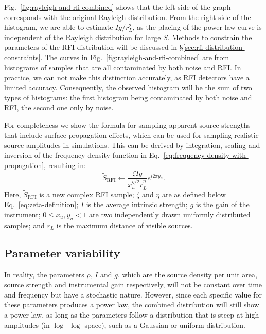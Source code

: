 \documentclass[useAMS,usenatbib]{mn2e}
\begin{document}
Fig.~\ref{fig:rayleigh-and-rfi-combined} shows that the left side of the graph corresponds with the original Rayleigh distribution. From the right side of the histogram, we are able to estimate $Ig/r_L^2$, as the placing of the power-law curve is independent of the Rayleigh distribution for large $S$. Methods to constrain the parameters of the RFI distribution will be discussed in \S\ref{sec:rfi-distribution-constraints}. The curves in Fig.~\ref{fig:rayleigh-and-rfi-combined} are from histograms of samples that are all contaminated by both noise and RFI. In practice, we can not make this distinction accurately, as RFI detectors have a limited accuracy. Consequently, the observed histogram will be the sum of two types of histograms: the first histogram being contaminated by both noise and RFI, the second one only by noise.

For completeness we show the formula for sampling apparent source strengths that include surface propagation effects, which can be used for sampling realistic source amplitudes in simulations. This can be derived by integration, scaling and inversion of the frequency density function in Eq.~\eqref{eq:frequency-density-with-propagation}, resulting in:
\begin{equation} \label{eq:sample-with-propagation}
\tilde{S}_{\textrm{RFI}} \leftarrow \frac{\zeta I g}{x_u^{\eta/2} r_L^\eta} e^{i 2 \pi y_u}.
\end{equation}
Here, $\tilde{S}_{\textrm{RFI}}$ is a new complex RFI sample; $\zeta$ and $\eta$ are as defined below Eq.~\eqref{eq:zeta-definition}; $I$ is the average intrinsic strength; $g$ is the gain of the instrument; $0 \le x_u,y_u < 1$ are two independently drawn uniformly distributed samples; and $r_L$ is the maximum distance of visible sources.

\subsection{Parameter variability} \label{sec:parameter-variability}
In reality, the parameters $\rho$, $I$ and $g$, which are the source density per unit area, source strength and instrumental gain respectively, will not be constant over time and frequency but have a stochastic nature. However, since each specific value for these parameters produces a power law, the combined distribution will still show a power law, as long as the parameters follow a distribution that is steep at high amplitudes (in $\log$--$\log$ space), such as a Gaussian or uniform distribution.
\end{document}
